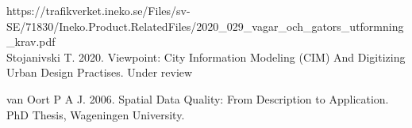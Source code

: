 \documentclass[a4paper]{article}
\begin{document}
\begin{thebibliography}{9}
https://trafikverket.ineko.se/Files/sv-SE/71830/Ineko.Product.RelatedFiles/2020\_029\_vagar\_och\_gators\_utformning\_krav.pdf \\

Stojanivski T. 2020. Viewpoint: City Information Modeling (CIM) And Digitizing Urban Design Practises.
Under review

van Oort P A J. 2006. Spatial Data Quality: From Description to Application. PhD Thesis, Wageningen University.

\end{thebibliography}
\end{document}
